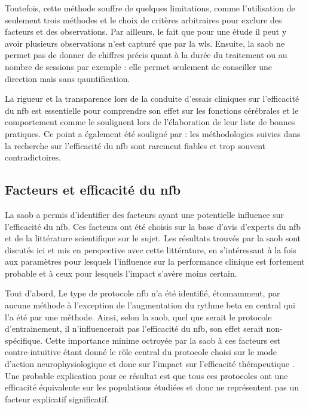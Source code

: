 Toutefois, cette méthode souffre de quelques limitations, comme 
l'utilisation de seulement trois méthodes et le choix de critères arbitraires pour exclure des facteurs et des observations. Par ailleurs, le fait que pour une étude il peut y 
avoir plusieurs observations n'est capturé que par la \gls{wls}. Ensuite, la \gls{saob} ne permet pas de donner de chiffres précis quant à la durée du traitement ou au 
nombre de sessions par exemple : elle permet seulement de conseiller une direction mais sans qauntification.

La rigueur et la transparence lors de la conduite d'essais cliniques sur l'efficacité
du \gls{nfb} est essentielle pour comprendre son effet sur les fonctions cérébrales et le comportement comme le soulignent \citet{Ros2019} lors de l'élaboration
de leur liste de bonnes pratiques. Ce point a également été souligné par \citet{Rogala2016} : les méthodologies suivies dans la recherche sur l'efficacité du
\gls{nfb} sont rarement fiables et trop souvent contradictoires.

\subsection{Facteurs et efficacité du \gls{nfb}}

La \gls{saob} a permis d'identifier des facteurs ayant une potentielle influence sur l'efficacité du \gls{nfb}. Ces facteurs ont été choisis sur la base d'avis d'experts
du \gls{nfb} et de la littérature scientifique sur le sujet. Les résultats trouvés par la \gls{saob} sont discutés ici et mis en perspective avec cette littérature, en s'intéressant à la fois 
aux paramètres pour lesquels l'influence sur la performance clinique est fortement probable et à ceux pour lesquels l'impact s'avère moins certain. 

Tout d'abord, Le type de protocole \gls{nfb} n'a été identifié, étonnamment, par aucune méthode à l'exception de l'augmentation du rythme beta en central qui l'a été par une méthode. 
Ainsi, selon la \gls{saob}, quel que serait le protocole d'entrainement, il n'influencerait pas l'efficacité du \gls{nfb}, son effet serait non-spécifique. Cette importance 
minime octroyée par la \gls{saob} à ces facteurs est contre-intuitive étant donné le rôle central du protocole choisi sur le mode d'action neurophysiologique 
et donc sur l'impact sur l'efficacité thérapeutique \citep{Vernon2004, Heinrich2019}. Une probable 
explication pour ce résultat est que tous ces protocoles ont une efficacité équivalente sur les populations étudiées et donc ne représentent 
pas un facteur explicatif significatif.
  

